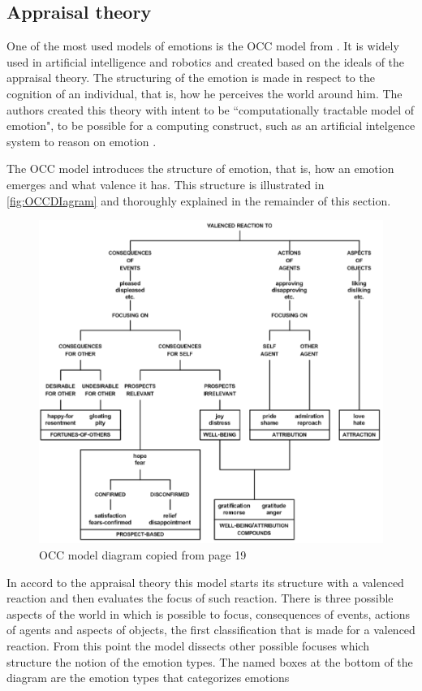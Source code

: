 \subsection{Appraisal theory}

One of the most used models of emotions is the OCC model from \cite{ortony1990cognitive}. It is widely used in artificial intelligence and robotics and created based on the ideals of the appraisal theory. The structuring of the emotion is made in respect to the cognition of an individual, that is, how he perceives the world around him. The authors created this theory with intent to be ``computationally tractable model of emotion"\cite{ortony1990cognitive}, to be possible for a computing construct, such as an artificial intelgence system to reason on emotion \citep{ortony1990cognitive}.

The OCC model introduces the structure of emotion, that is, how an emotion emerges and what valence it has. This structure is illustrated in \autoref{fig:OCCDIagram} and thoroughly explained in the remainder of this section. 
\begin{figure}[p]
    \centering
    \includegraphics[width=\textwidth,height=0.7\textheight]{Images/OCCDEsenho.png}
    \caption{OCC model diagram copied from \cite{ortony1990cognitive} page 19}
    \label{fig:OCCDIagram}
\end{figure}

In accord to the appraisal theory this model starts its structure with a valenced reaction and then evaluates the focus of such reaction. There is three possible aspects of the world in which is possible to focus, consequences of events, actions of agents and aspects of objects, the first classification that is made for a valenced reaction. From this point the model dissects other possible focuses which structure the notion of the emotion types. The named boxes at the bottom of the diagram are the emotion types that categorizes emotions
